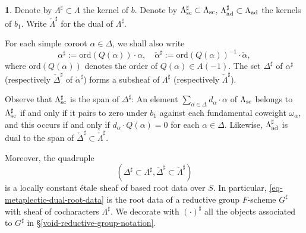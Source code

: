 \documentclass[10pt,english,reqno]{amsart}
\newcommand{\ord}{\mathrm{ord}}
\newcommand{\sconn}{\textnormal{sc}}
\newcommand{\adjoint}{\textnormal{ad}}
\theoremstyle{definition}
\numberwithin{equation}{section}
\newtheorem{untitledsubsubsection}[subsubsection]{}
\newenvironment{void}
{\begin{untitledsubsubsection}}
{\end{untitledsubsubsection}}
\begin{document}

\begin{void}
\label{void-sharp-lattices}
Denote by $\Lambda^{\sharp} \subset \Lambda$ the kernel of $b$. Denote by $\Lambda^{\sharp}_{\sconn} \subset \Lambda_{\sconn}$, $\Lambda^{\sharp}_{\adjoint} \subset \Lambda_{\adjoint}$ the kernels of $b_1$. Write $\check{\Lambda}^{\sharp}$ for the dual of $\Lambda^{\sharp}$.

For each simple coroot $\alpha \in \Delta$, we shall also write
$$
\alpha^{\sharp} := \ord(Q(\alpha))\cdot\alpha,\quad \check{\alpha}^{\sharp} := \ord(Q(\alpha))^{-1}\cdot\check{\alpha},
$$
where $\ord(Q(\alpha))$ denotes the order of $Q(\alpha) \in A(-1)$. The set $\Delta^{\sharp}$ of $\alpha^{\sharp}$ (respectively $\check{\Delta}^{\sharp}$ of $\check{\alpha}^{\sharp}$) forms a subsheaf of $\Lambda^{\sharp}$ (respectively $\check{\Lambda}^{\sharp}$).

Observe that $\Lambda_{\sconn}^{\sharp}$ is the span of $\Delta^{\sharp}$: An element $\sum_{\alpha \in \Delta} d_{\alpha}\cdot\alpha$ of $\Lambda_{\sconn}$ belongs to $\Lambda^{\sharp}_{\sconn}$ if and only if it pairs to zero under $b_1$ against each fundamental coweight $\omega_{\alpha}$, and this occurs if and only if $d_{\alpha}\cdot Q(\alpha) = 0$ for each $\alpha\in\Delta$. Likewise, $\Lambda^{\sharp}_{\adjoint}$ is dual to the span of $\check{\Delta}^{\sharp}\subset\check{\Lambda}^{\sharp}$.

Moreover, the quadruple 
\begin{equation}
\label{eq-metaplectic-dual-root-data}
(\Delta^{\sharp} \subset \Lambda^{\sharp}, \check{\Delta}^{\sharp} \subset \check{\Lambda}^{\sharp})
\end{equation}
is a locally constant \'etale sheaf of based root data over $S$. In particular, \eqref{eq-metaplectic-dual-root-data} is the root data of a reductive group $F$-scheme $G^{\sharp}$ with sheaf of cocharacters $\Lambda^{\sharp}$. We decorate with $(\cdot)^{\sharp}$ all the objects associated to $G^{\sharp}$ in \S\ref{void-reductive-group-notation}.
\end{void}

\end{document}
